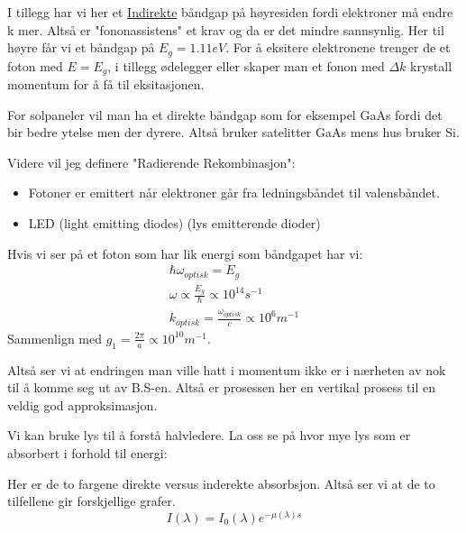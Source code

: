 \documentclass{article}
\begin{document}
I tillegg har vi her et \underline{Indirekte} båndgap på høyresiden fordi elektroner må endre k mer. Altså er "fononassistens" et krav og da er det mindre sannsynlig. Her til høyre får vi et båndgap på $E_g = 1.11 eV$. For å eksitere elektronene trenger de et foton med $E = E_g$, i tillegg ødelegger eller skaper man et fonon med $\Delta k$ krystall momentum for å få til eksitasjonen.


For solpaneler vil man ha et direkte båndgap som for eksempel GaAs fordi det bir bedre ytelse men der dyrere. Altså bruker satelitter GaAs mens hus bruker Si.

Videre vil jeg definere "Radierende Rekombinasjon":
\begin{itemize}
  \item Fotoner er emittert når elektroner går fra ledningsbåndet til valensbåndet.
  \item LED (light emitting diodes) (lys emitterende dioder)
\end{itemize}

Hvis vi ser på et foton som har lik energi som båndgapet har vi:
\begin{align}
  \hbar \omega_{optisk} = E_g \\
  \omega \propto \frac{E_g}{\hbar} \propto 10^{14} s^{-1} \\
  k_{optisk} = \frac{\omega_{optisk}}{c} \propto 10^6 m^{-1}
\end{align}
Sammenlign med $g_1 = \frac{2 \pi}{a} \propto 10^{10} m^{-1}$.

Altså ser vi at endringen man ville hatt i momentum ikke er i nærheten av nok til å komme seg ut av B.S-en. Altså er prosessen her en vertikal prosess til en veldig god approksimasjon. 

Vi kan bruke lys til å forstå halvledere. La oss se på hvor mye lys som er absorbert i forhold til energi:


Her er de to fargene direkte versus inderekte absorbsjon. Altså ser vi at de to tilfellene gir forskjellige grafer.
\begin{equation}
  I(\lambda) = I_0(\lambda) e^{-\mu (\lambda) s}
\end{equation}
\end{document}
